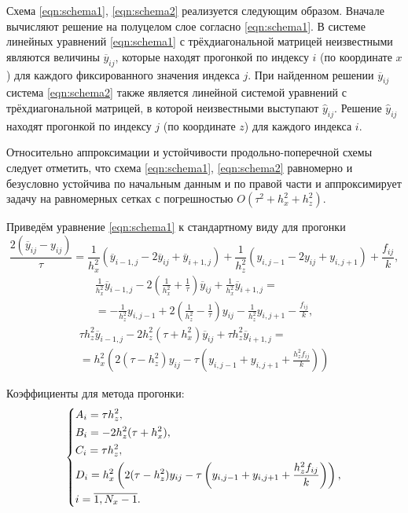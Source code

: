 Схема \eqref{eqn:schema1}, \eqref{eqn:schema2} реализуется следующим образом.
Вначале вычисляют решение на полуцелом слое согласно \eqref{eqn:schema1}.
В системе линейных уравнений \eqref{eqn:schema1} с трёхдиагональной матрицей неизвестными являются величины $\overline y_{ij}$, которые находят прогонкой по индексу $i$ (по координате $x$) для каждого фиксированного значения индекса $j$.
При найденном решении $\overline y_{ij}$ система \eqref{eqn:schema2} также является линейной системой уравнений с трёхдиагональной матрицей, в которой неизвестными выступают $\hat y_{ij}$.
Решение $\hat y_{ij}$ находят прогонкой по индексу $j$ (по координате $z$) для каждого индекса $i$.

Относительно аппроксимации и устойчивости продольно-поперечной схемы следует отметить, что схема \eqref{eqn:schema1}, \eqref{eqn:schema2} равномерно и безусловно устойчива по начальным данным и по правой части и аппроксимирует задачу на равномерных сетках с погрешностью $O(\tau^2 + h_x^2 + h_z^2)$.

Приведём уравнение \eqref{eqn:schema1} к стандартному виду для прогонки
\begin{equation}
	\frac{2(\overline y_{ij} - y_{ij})}{\tau} = \frac{1}{h_x^2} (\overline y_{i - 1, j} - 2\overline y_{ij} + \overline y_{i + 1, j}) + \frac{1}{h_z^2} (y_{i, j - 1} - 2y_{ij} + y_{i, j + 1}) + \frac{f_{ij}}k,
\end{equation}
\begin{multline*}
	\frac{1}{h_x^2}\overline y_{i - 1, j} - 2 \left(\frac1{h_x^2} + \frac1\tau \right)\overline y_{ij} + \frac{1}{h_x^2}\overline y_{i + 1, j} = \\
	= -\frac{1}{h_z^2}y_{i, j - 1} + 2\left(\frac1{h_z^2} - \frac1\tau\right)y_{ij} - \frac{1}{h_z^2}y_{i, j + 1} - \frac{f_{ij}}k,
\end{multline*}
\begin{multline*}
	\tau h_z^2 \overline y_{i - 1, j} - 2h_z^2(\tau + h_x^2)\overline y_{ij} + \tau h_z^2 \overline y_{i + 1, j} = \\
	= h_x^2 \left( 2(\tau - h_z^2)y_{ij} - \tau \left( y_{i, j - 1} + y_{i, j + 1} + \frac{h_z^2 f_{ij}}k \right) \right)
\end{multline*}

Коэффициенты для метода прогонки:
\begin{equation}
	\begin{dcases}
		A_i = \tau h_z^2, \\
		B_i = -2h_z^2(\tau + h_x^2), \\
		C_i = \tau h_z^2, \\
		D_i = h_x^2 \left( 2(\tau - h_z^2)y_{ij} - \tau \left( y_{i, j - 1} + y_{i, j + 1} + \frac{h_z^2 f_{ij}}k \right) \right), \\
		i = \overline{1, N_x - 1}. \\
	\end{dcases}
\end{equation}


